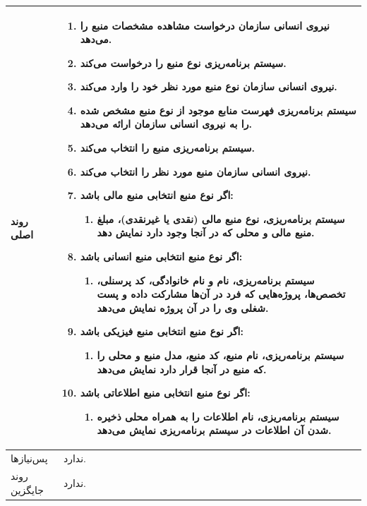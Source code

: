\begin{table}[H]
\begin{tabular}{|p{3cm}|p{10cm}|}
		
		روند اصلی &
		\begin{enumerate}[topsep=0cm,leftmargin=0.5cm]
			\item نیروی انسانی سازمان  درخواست مشاهده مشخصات منبع را می‌دهد.
			\item سیستم برنامه‌ریزی نوع منبع را درخواست می‌کند.
			\item نیروی انسانی سازمان  نوع منبع مورد نظر خود را وارد می‌کند.
			\item سیستم برنامه‌ریزی فهرست منابع موجود از نوع منبع مشخص شده را به نیروی انسانی سازمان ارائه می‌دهد.
			\item سیستم برنامه‌ریزی منبع را انتخاب می‌کند.
			\item نیروی انسانی سازمان منبع مورد نظر را انتخاب می‌کند.
			\item اگر نوع منبع انتخابی منبع مالی باشد:
				\begin{enumerate}
					\item سیستم برنامه‌ریزی، نوع منبع مالی (نقدی یا غیرنقدی)، مبلغ منبع مالی و محلی که در آنجا وجود دارد نمایش دهد.
				\end{enumerate}
			\item اگر نوع منبع انتخابی منبع انسانی باشد:
			\begin{enumerate}
				\item سیستم برنامه‌ریزی، نام و نام خانوادگی، کد پرسنلی، تخصص‌ها، پروژه‌هایی که فرد در آن‌ها مشارکت داده و پست شغلی وی را در آن پروژه نمایش می‌دهد.
			\end{enumerate}
			\item اگر نوع منبع انتخابی منبع فیزیکی باشد:
			\begin{enumerate}
				\item سیستم برنامه‌ریزی، نام منبع، کد منبع، مدل منبع و محلی را که منبع در آنجا قرار دارد نمایش می‌دهد.
			\end{enumerate}
			\item اگر نوع منبع انتخابی منبع اطلاعاتی باشد:
			\begin{enumerate}
				\item سیستم برنامه‌ریزی، نام اطلاعات را به همراه محلی ذخیره شدن آن اطلاعات در سیستم برنامه‌ریزی نمایش می‌دهد.
			\end{enumerate}
		\end{enumerate} \\
		\hline
		
		پس‌نیازها & ندارد. \\
		
		\hline
		روند جایگزین
		& ندارد. \\
		\hline
		
	\end{tabular}
\end{table}



